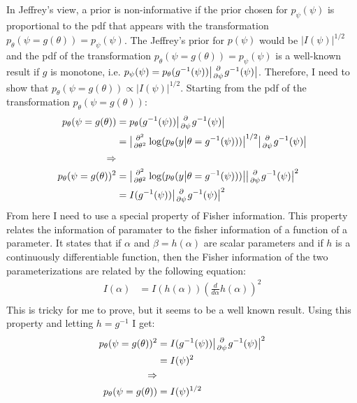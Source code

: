 \section{}

In Jeffrey's view, a prior is non-informative if the prior chosen for $p_{\psi}(\psi)$ is proportional to the pdf that appears with the transformation $p_{\theta}(\psi=g(\theta)) = p_\psi(\psi)$.
The Jeffrey's prior for $p(\psi)$ would be $\big|I(\psi)\big|^{1/2}$ and the pdf of the transformation $p_{\theta}(\psi=g(\theta)) = p_\psi(\psi)$ is a well-known result if $g$ is monotone, i.e. $p_\psi(\psi)= p_\theta(g^{-1}(\psi))\big|\partiald{}{\psi}g^{-1}(\psi)\big|$.
Therefore, I need to show that $p_{\theta}(\psi=g(\theta)) \propto \big|I(\psi)\big|^{1/2}$.
Starting from the pdf of the transformation $p_{\theta}(\psi=g(\theta))$:
\begin{align*}
    p_{\theta}(\psi=g(\theta))&= p_\theta(g^{-1}(\psi))\big|\partiald{}{\psi}g^{-1}(\psi)\big|\\
                             &=\big|\secpartiald{}{\theta}\log(p_\theta(y\big|\theta=g^{-1}(\psi)))\big|^{1/2}\big|\partiald{}{\psi}g^{-1}(\psi)\big|\\
                              \Rightarrow\\
p_{\theta}(\psi=g(\theta))^2 &= \big|\secpartiald{}{\theta}\log(p_\theta(y\big|\theta=g^{-1}(\psi)))\big|\big|\partiald{}{\psi}g^{-1}(\psi)\big|^2\\
                             &= I(g^{-1}(\psi))\big|\partiald{}{\psi}g^{-1}(\psi)\big|^2\\
\end{align*}
From here I need to use a special property of Fisher information.
This property relates the information of paramater to the fisher information of a function of a parameter.
It states that if $\alpha$ and $\beta = h(\alpha)$ are scalar parameters and if $h$ is a continuously differentiable function, then the Fisher information of the two parameterizations are related by the following equation:
\begin{align*}
    I(\alpha) &= I(h(\alpha))(\frac{d }{d\alpha}h(\alpha))^2\\
\end{align*}
This is tricky for me to prove, but it seems to be a well known result.
Using this property and letting $h = g^{-1}$ I get:
\begin{align*}
     p_{\theta}(\psi=g(\theta))^2 &= I(g^{-1}(\psi))\big|\partiald{}{\psi}g^{-1}(\psi)\big|^2\\
                                &= I(\psi)^2\\
                              \Rightarrow\\
     p_{\theta}(\psi=g(\theta)) &= I(\psi)^{1/2}\\
\end{align*}
